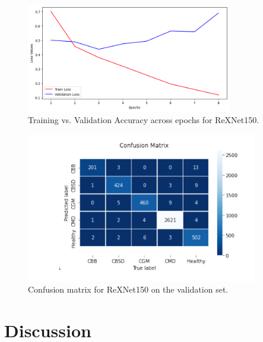 \begin{figure}[H]
  \centering
  \includegraphics[width=0.8\textwidth]{figures/ac1.png}
  \caption{Training vs. Validation Accuracy across epochs for ReXNet150.}
  \label{fig:acc_curve}
\end{figure}

\begin{figure}[H]
  \centering
  \includegraphics[width=0.9\textwidth]{figures/mtx.png}
  \caption{Confusion matrix for ReXNet150 on the validation set.}
  \label{fig:conf_matrix}
\end{figure}

\section{Discussion}
